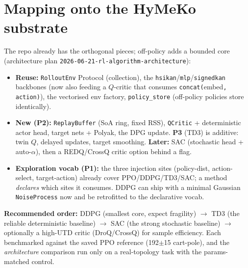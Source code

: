 \documentclass[11pt]{article}
\newcommand{\code}[1]{\texttt{\small #1}}
\begin{document}
\section{Mapping onto the HyMeKo substrate}
The repo already has the orthogonal pieces; off-policy adds a bounded core (architecture plan
\code{2026-06-21-rl-algorithm-architecture}):
\begin{itemize}[nosep]
  \item \textbf{Reuse:} \code{RolloutEnv} Protocol (collection), the \code{hsikan}/\code{mlp}/\code{signedkan}
        backbones (now also feeding a $Q$-critic that consumes \code{concat(}embed\code{, action)}), the
        vectorised env factory, \code{policy\_store} (off-policy policies store identically).
  \item \textbf{New (P2):} \code{ReplayBuffer} (SoA ring, fixed RSS), \code{QCritic} + deterministic actor
        head, target nets + Polyak, the DPG update. \textbf{P3} (TD3) is additive: twin $Q$, delayed updates,
        target smoothing. \textbf{Later:} SAC (stochastic head + auto-$\alpha$), then a REDQ/CrossQ critic
        option behind a flag.
  \item \textbf{Exploration vocab (P1):} the three injection sites (policy-dist, action-select, target-action)
        already cover PPO/DDPG/TD3/SAC; a method \emph{declares} which sites it consumes. DDPG can ship with a
        minimal Gaussian \code{NoiseProcess} now and be retrofitted to the declarative vocab.
\end{itemize}
\textbf{Recommended order:} DDPG (smallest core, expect fragility) $\to$ TD3 (the reliable deterministic
baseline) $\to$ SAC (the strong stochastic baseline) $\to$ optionally a high-UTD critic (DroQ/CrossQ) for
sample efficiency. Each benchmarked against the saved PPO reference (192$\pm$15 cart-pole), and the
\emph{architecture} comparison run only on a real-topology task with the params-matched control.
\end{document}
